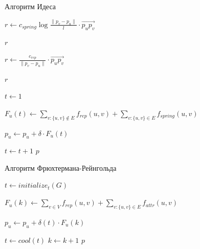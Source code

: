 \documentclass{beamer}
\begin{document}
\begin{frame}{Алгоритм Идеса}
	\begin{algorithm}[H]
		\caption{Алгоритм Идеса}
		\begin{algorithmic}[1]
			{\ttfamily \small{
					\State $r \gets c_{spring}\log{\frac{\|p_v - p_u \|}{l}}  \cdot \overrightarrow{p_u p_v}$

					\Return $r$
					\EndFunction


					\State $r \gets \frac{c_{rep}}{\|p_v - p_u \|} \cdot \overrightarrow{p_u p_v}  $

					\Return $r$
					\EndFunction


					\State $t \gets 1$

					\State $F_{u}(t) \gets \sum_{v:\{u,v\} \notin E}{f_{rep}(u, v)} + \sum_{v:\{u,v\} \in E}{f_{spring}(u, v)}$


					\EndFor
					\State $p_u \gets p_u + \delta \cdot F_u(t)$
					\EndFor

					\State $t \gets t + 1$
					\EndWhile
					\Return $p$
					\EndFunction

				}}

		\end{algorithmic}
	\end{algorithm}
\end{frame}
\begin{frame}{Алгоритм Фрюхтермана-Рейнгольда}
	\begin{algorithm}[H]
		\caption{Основной алгоритм}
		\begin{algorithmic}[1]

			{\ttfamily \small{
          \State $t \gets initialize_t(G)$

					\State $F_{u}(k) \gets \sum_{v \in V}{f_{rep}(u, v)} + \sum_{v:\{u,v\} \in E}{f_{attr}(u, v)}$


					\EndFor
					\State $p_u \gets p_u + \delta(t) \cdot F_u(k)$
					\EndFor

					\State $t \gets cool(t)$
					\State $k \gets k + 1$
					\EndWhile
					\Return $p$
					\EndFunction
				}}

		\end{algorithmic}
	\end{algorithm}
\end{frame}
\end{document}
